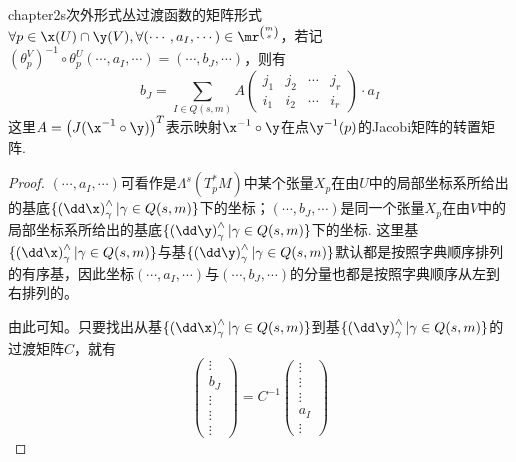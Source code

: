 \begin{mylem}{}{chapter2s次外形式丛过渡函数的矩阵形式}
		$\forall p\in\x(U)\cap\y(V),\forall(\cdots,a_{I},\cdots)\in \mr^{\binom{m}{s}}$，若记$(\theta^{V}_{p})^{-1}\circ\theta^{U}_{p}(\cdots,a_{I},\cdots)=(\cdots,b_{J},\cdots)$，则有
		\[
		b_{J}=\sum_{I\in Q(s,m)}A \left(\begin{array}{cccc} j_{1} & j_{2} & \cdots & j_{r} \\i_{1} & i_{2} & \cdots & i_{r}\end{array}\right)\cdot a_{I}
		\]
		这里$A=\left( J(\x^{-1}\circ \y ) \right)^{T} $表示映射$\x^{-1}\circ\y$在点$\y^{-1}(p)$的Jacobi矩阵的转置矩阵. 
\end{mylem}
\begin{proof}
	$(\cdots,a_{I},\cdots)$可看作是$\Lambda^{s}(T^{\ast}_{p}M)$中某个张量$X_{p}$在由$U$中的局部坐标系所给出的基底$\{\left( \dd \x \right)^{\wedge}_{\gamma} |\gamma\in Q(s,m)\}$下的坐标；$(\cdots,b_{J},\cdots)$是同一个张量$X_{p}$在由$V$中的局部坐标系所给出的基底$\{\left( \dd \y \right)^{\wedge}_{\gamma} |\gamma\in Q(s,m)\}$下的坐标. 这里基$\{\left( \dd \x \right)^{\wedge}_{\gamma} |\gamma\in Q(s,m)\}$与基$\{\left( \dd \y \right)^{\wedge}_{\gamma} |\gamma\in Q(s,m)\}$默认都是按照字典顺序排列的有序基，因此坐标$(\cdots,a_{I},\cdots)$与$(\cdots,b_{J},\cdots)$的分量也都是按照字典顺序从左到右排列的。
			
	由此可知{}。只要找出从基$\{\left( \dd \x \right)^{\wedge}_{\gamma} |\gamma\in Q(s,m)\}$到基$\{\left( \dd \y \right)^{\wedge}_{\gamma} |\gamma\in Q(s,m)\}$的过渡矩阵$C$，就有
	\[
		\left( \begin{array}{ccccc}{\vdots} \\ {b_{J}}  \\ {\vdots} \\ {\vdots}\\ {\vdots}\end{array}\right)=C^{-1}\left( \begin{array}{ccccc}{\vdots} \\ {\vdots}  \\ {\vdots} \\ {a_{I}}\\ {\vdots}\end{array}\right)
	\]


\end{proof}
